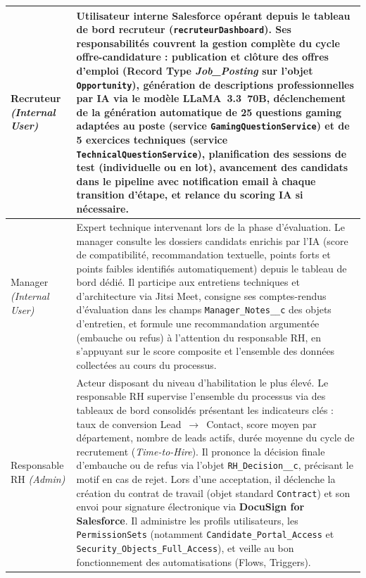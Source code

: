 \begin{longtable}{|p{3.5cm}|p{11.5cm}|}
Recruteur \newline\textit{(Internal User)} & Utilisateur interne Salesforce opérant depuis le tableau de bord recruteur (\texttt{recruteurDashboard}). Ses responsabilités couvrent la gestion complète du cycle offre-candidature : publication et clôture des offres d'emploi (Record Type \textit{Job\_Posting} sur l'objet \texttt{Opportunity}), génération de descriptions professionnelles par IA via le modèle LLaMA~3.3~70B, déclenchement de la génération automatique de 25 questions gaming adaptées au poste (service \texttt{GamingQuestionService}) et de 5 exercices techniques (service \texttt{TechnicalQuestionService}), planification des sessions de test (individuelle ou en lot), avancement des candidats dans le pipeline avec notification email à chaque transition d'étape, et relance du scoring IA si nécessaire. \\
\hline

Manager \newline\textit{(Internal User)} & Expert technique intervenant lors de la phase d'évaluation. Le manager consulte les dossiers candidats enrichis par l'IA (score de compatibilité, recommandation textuelle, points forts et points faibles identifiés automatiquement) depuis le tableau de bord dédié. Il participe aux entretiens techniques et d'architecture via Jitsi Meet, consigne ses comptes-rendus d'évaluation dans les champs \texttt{Manager\_Notes\_\_c} des objets d'entretien, et formule une recommandation argumentée (embauche ou refus) à l'attention du responsable RH, en s'appuyant sur le score composite et l'ensemble des données collectées au cours du processus. \\
\hline

Responsable RH \newline\textit{(Admin)} & Acteur disposant du niveau d'habilitation le plus élevé. Le responsable RH supervise l'ensemble du processus via des tableaux de bord consolidés présentant les indicateurs clés : taux de conversion Lead~$\rightarrow$~Contact, score moyen par département, nombre de leads actifs, durée moyenne du cycle de recrutement (\textit{Time-to-Hire}). Il prononce la décision finale d'embauche ou de refus via l'objet \texttt{RH\_Decision\_\_c}, précisant le motif en cas de rejet. Lors d'une acceptation, il déclenche la création du contrat de travail (objet standard \texttt{Contract}) et son envoi pour signature électronique via \textbf{DocuSign for Salesforce}. Il administre les profils utilisateurs, les \texttt{PermissionSets} (notamment \texttt{Candidate\_Portal\_Access} et \texttt{Security\_Objects\_Full\_Access}), et veille au bon fonctionnement des automatisations (Flows, Triggers). \\
\hline


\end{longtable}
